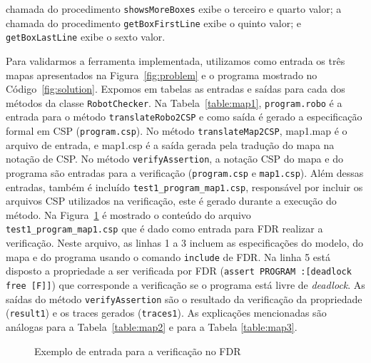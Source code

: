 chamada do procedimento \texttt{showsMoreBoxes} exibe o terceiro e quarto valor; a chamada do procedimento \texttt{getBoxFirstLine} exibe o quinto valor; e \texttt{getBoxLastLine} exibe o sexto valor.





Para validarmos a ferramenta implementada, utilizamos como entrada os três mapas apresentados na Figura~\ref{fig:problem} e o programa mostrado no Código~\ref{fig:solution}. Expomos em tabelas as entradas e saídas para cada dos métodos da classe \texttt{RobotChecker}. Na Tabela~\ref{table:map1}, \texttt{program.robo} é a entrada para o método \texttt{translateRobo2CSP} e como saída é gerado a especificação formal em CSP (\texttt{program.csp}). No método \texttt{translateMap2CSP}, map1.map é o arquivo de entrada, e map1.csp é a saída gerada pela tradução do mapa na notação de CSP. No método \texttt{verifyAssertion}, a notação CSP do mapa e do programa são entradas para a verificação (\texttt{program.csp} e \texttt{map1.csp}). Além dessas entradas, também é incluído \texttt{test1\_program\_map1.csp}, responsável por incluir os arquivos CSP utilizados na verificação, este é gerado durante a execução do método. Na Figura~\ref{fig:test} é mostrado o conteúdo do arquivo \texttt{test1\_program\_map1.csp} que é dado como entrada para FDR realizar a verificação. Neste arquivo, as linhas 1 a 3 incluem as especificações do modelo, do mapa e do programa usando o comando \texttt{include} de FDR. Na linha 5 está disposto a propriedade a ser verificada por FDR (\texttt{assert PROGRAM :[deadlock free [F]]}) que corresponde a verificação se o programa está livre de \textit{deadlock}. As saídas do método \texttt{verifyAssertion} são o resultado da verificação da propriedade (\texttt{result1}) e os traces gerados (\texttt{traces1}). As explicações mencionadas são análogas para a Tabela~\ref{table:map2} e para a Tabela \ref{table:map3}.

\begin{figure}[h]
\centering
\caption{Exemplo de entrada para a verificação no FDR}

\label{fig:test}
\end{figure}

